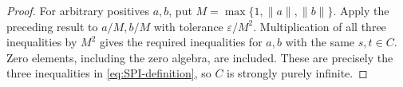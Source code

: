\begin{proof}
For arbitrary positives $a,b$, put $M=\max\{1,\|a\|,\|b\|\}$.
Apply the preceding result to $a/M,b/M$ with tolerance
$\varepsilon/M^2$.  Multiplication of all three inequalities by
$M^2$ gives the required inequalities for $a,b$ with the same
$s,t\in C$.  Zero elements, including the zero algebra, are included.
These are precisely the three inequalities in \eqref{eq:SPI-definition},
so $C$ is strongly purely infinite.
\end{proof}
